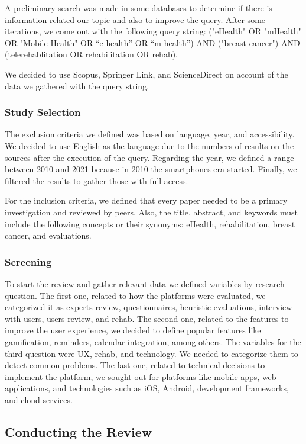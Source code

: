 \documentclass[conference]{IEEEtran}
\begin{document}
A preliminary search was made in some databases to determine if there is information related our topic and also to improve the query. After some iterations, we come out with the following query string: ("eHealth" OR "mHealth" OR "Mobile Health" OR “e-health” OR “m-health”) AND ("breast cancer") AND (telerehablitation OR rehabilitation OR rehab).

We decided to use Scopus, Springer Link, and ScienceDirect on account of the data we gathered with the query string.


\subsubsection{Study Selection}
The exclusion criteria we defined was based on language, year, and accessibility.  We decided to use English as the language due to the numbers of results on the sources after the execution of the query. Regarding the year, we defined a range between 2010 and 2021 because in 2010 the smartphones era started. Finally, we filtered the results to gather those with full access.

For the inclusion criteria, we defined that every paper needed to be a primary investigation and reviewed by peers. Also, the title, abstract, and keywords must include the following concepts or their synonyms: eHealth, rehabilitation, breast cancer, and evaluations.

\subsubsection{Screening}
To start the review and gather relevant data we defined variables by research question. The first one, related to how the platforms were evaluated, we categorized it as experts review, questionnaires, heuristic evaluations, interview with users, users review, and rehab. The second one, related to the features to improve the user experience, we decided to define popular features like gamification, reminders, calendar integration, among others. The variables for the third question were UX, rehab, and technology. We needed to categorize them to detect common problems. The last one, related to technical decisions to implement the platform, we sought out for platforms like mobile apps, web applications, and technologies such as iOS, Android, development frameworks, and cloud services. 

\subsection{Conducting the Review}


\begin{comment}

\end{comment}



\end{document}
